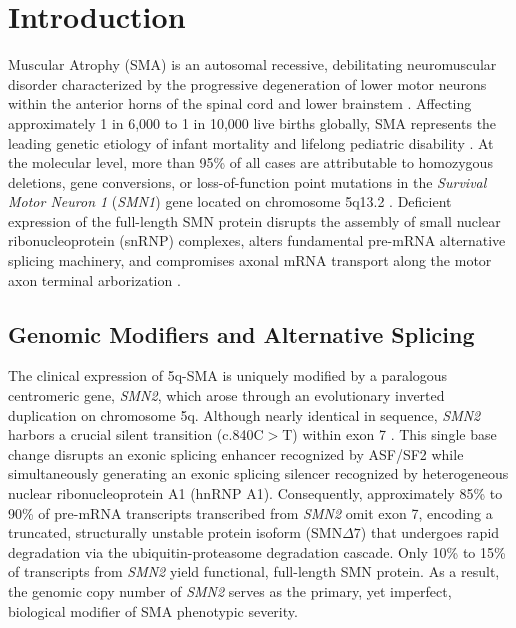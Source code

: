 \documentclass[journal]{IEEEtran}
\begin{document}
\section{Introduction}

 Muscular Atrophy (SMA) is an autosomal recessive, debilitating neuromuscular disorder characterized by the progressive degeneration of lower motor neurons within the anterior horns of the spinal cord and lower brainstem \cite{mercuri2018nusinersen,finkel2018diagnosis}. Affecting approximately 1 in 6,000 to 1 in 10,000 live births globally, SMA represents the leading genetic etiology of infant mortality and lifelong pediatric disability \cite{prior2004homozygous}. At the molecular level, more than 95\% of all cases are attributable to homozygous deletions, gene conversions, or loss-of-function point mutations in the \textit{Survival Motor Neuron 1} (\textit{SMN1}) gene located on chromosome 5q13.2 \cite{lefebvre1995identification}. Deficient expression of the full-length SMN protein disrupts the assembly of small nuclear ribonucleoprotein (snRNP) complexes, alters fundamental pre-mRNA alternative splicing machinery, and compromises axonal mRNA transport along the motor axon terminal arborization \cite{pellizzoni1998novel,wirth2021spinal}.

\subsection{Genomic Modifiers and Alternative Splicing}
The clinical expression of 5q-SMA is uniquely modified by a paralogous centromeric gene, \textit{SMN2}, which arose through an evolutionary inverted duplication on chromosome 5q. Although nearly identical in sequence, \textit{SMN2} harbors a crucial silent transition (c.840C$>$T) within exon 7 \cite{lorson1999single}. This single base change disrupts an exonic splicing enhancer recognized by ASF/SF2 while simultaneously generating an exonic splicing silencer recognized by heterogeneous nuclear ribonucleoprotein A1 (hnRNP A1). Consequently, approximately 85\% to 90\% of pre-mRNA transcripts transcribed from \textit{SMN2} omit exon 7, encoding a truncated, structurally unstable protein isoform ($\text{SMN}\Delta7$) that undergoes rapid degradation via the ubiquitin-proteasome degradation cascade. Only 10\% to 15\% of transcripts from \textit{SMN2} yield functional, full-length SMN protein. As a result, the genomic copy number of \textit{SMN2} serves as the primary, yet imperfect, biological modifier of SMA phenotypic severity.
\end{document}
